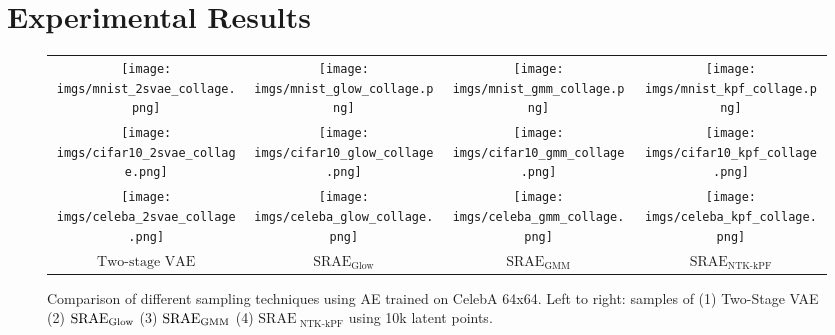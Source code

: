 \section{Experimental Results}
\begin{figure*}[b]
    \vspace{0.3em}
    \centering
    \setlength{\tabcolsep}{1.5pt}
    \renewcommand{\arraystretch}{1.2}
    \begin{tabular}{cccc}
    \texttt{[image: imgs/mnist\_2svae\_collage.png]} &
    \texttt{[image: imgs/mnist\_glow\_collage.png]} &
    \texttt{[image: imgs/mnist\_gmm\_collage.png]} &
    \texttt{[image: imgs/mnist\_kpf\_collage.png]}\\
    \texttt{[image: imgs/cifar10\_2svae\_collage.png]} &
    \texttt{[image: imgs/cifar10\_glow\_collage.png]} &
    \texttt{[image: imgs/cifar10\_gmm\_collage.png]} &
    \texttt{[image: imgs/cifar10\_kpf\_collage.png]}\\
    \texttt{[image: imgs/celeba\_2svae\_collage.png]} &
    \texttt{[image: imgs/celeba\_glow\_collage.png]} &
    \texttt{[image: imgs/celeba\_gmm\_collage.png]} &
    \texttt{[image: imgs/celeba\_kpf\_collage.png]}\\
     $\textrm{Two-stage VAE}$ & $\textrm{SRAE}_\textrm{Glow}$ & $\textrm{SRAE}_\textrm{GMM}$ & $\textrm{SRAE}_\textrm{NTK-kPF}$
    \end{tabular}
    \vspace{-8pt}
    \caption{Comparison of different sampling techniques using AE trained on CelebA 64x64. Left to right: samples of (1) Two-Stage VAE \citep{dai2018diagnosing} (2) $\textrm{SRAE}_{\rm Glow}$ \citep{Kingma2018Glow} (3) $\textrm{SRAE}_{\rm GMM}$ (4) $\textrm{SRAE}_\textrm{ NTK-kPF}$ using 10k latent points.}
    \label{fig:celeba}
    \vspace{-1em}
\end{figure*}

